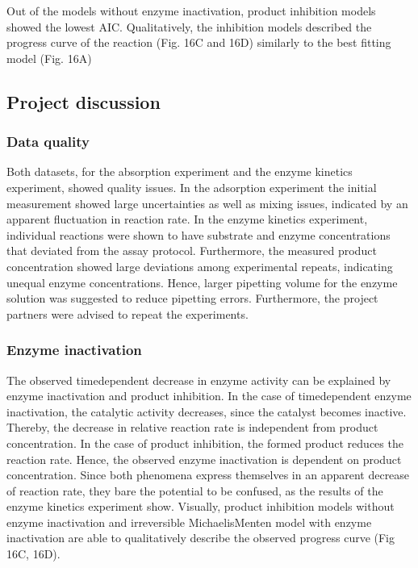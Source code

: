 \documentclass[letterpaper,12pt,english]{jupyterBook}
\begin{document}
\sphinxAtStartPar
Out of the models without enzyme inactivation, product inhibition models showed the lowest AIC. Qualitatively, the inhibition models  described the progress curve of the reaction (Fig. 16C and 16D) similarly to the best fitting model (Fig. 16A)


\subsection{Project discussion}
\label{\detokenize{scenarios/enzyme_inactivation:project-discussion}}

\subsubsection{Data quality}
\label{\detokenize{scenarios/enzyme_inactivation:data-quality}}
\sphinxAtStartPar
Both datasets, for the absorption experiment and the enzyme kinetics experiment, showed quality issues. In the adsorption experiment the initial measurement showed large uncertainties as well as mixing issues, indicated by an apparent fluctuation in reaction rate. In the enzyme kinetics experiment, individual reactions were shown to have substrate and enzyme concentrations that deviated from the assay protocol. Furthermore, the measured product concentration showed large deviations among experimental repeats, indicating unequal enzyme concentrations. Hence, larger pipetting volume for the enzyme solution was suggested to reduce pipetting errors.
Furthermore, the project partners were advised to repeat the experiments.


\subsubsection{Enzyme inactivation}
\label{\detokenize{scenarios/enzyme_inactivation:enzyme-inactivation}}
\sphinxAtStartPar
The observed time\sphinxhyphen{}dependent decrease in enzyme activity can be explained by enzyme inactivation and product inhibition. In the case of time\sphinxhyphen{}dependent enzyme inactivation, the catalytic activity decreases, since the catalyst becomes inactive. Thereby, the decrease in relative reaction rate is independent from product concentration.
In the case of product inhibition, the formed product reduces the reaction rate. Hence, the observed enzyme inactivation is dependent on product concentration.
Since both phenomena express themselves in an apparent decrease of reaction rate, they bare the potential to be confused, as the results of the enzyme kinetics experiment show. Visually, product inhibition models without enzyme inactivation and irreversible Michaelis\sphinxhyphen{}Menten model with enzyme inactivation are able to qualitatively describe the observed progress curve (Fig 16C, 16D).
\end{document}
